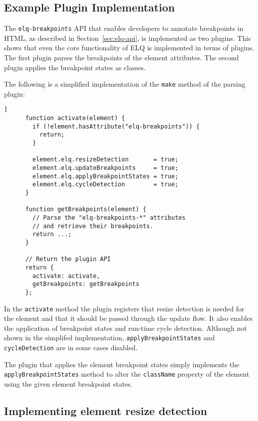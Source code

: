 \documentclass[]{llncs}
\newcommand{\code}[1]{\texttt{#1}}
\newcommand{\elq}{ELQ}
\begin{document}
  \subsection{Example Plugin Implementation}
    The \code{elq-breakpoints} API that enables developers to annotate breakpoints in HTML, as described in Section~\ref{sec:elq-api}, is implemented as two plugins.
    This shows that even the core functionality of \elq{} is implemented in terms of plugins.
    The first plugin parses the breakpoints of the element attributes.
    The second plugin applies the breakpoint states as classes.

    The following is a simplified implementation of the \code{make} method of the parsing plugin:

    \begin{lstlisting}[gobble=6,caption={},captionpos=b,label={}]]
      function activate(element) {
        if (!element.hasAttribute("elq-breakpoints")) {
          return;
        }

        element.elq.resizeDetection       = true;
        element.elq.updateBreakpoints     = true;
        element.elq.applyBreakpointStates = true;
        element.elq.cycleDetection        = true;
      }

      function getBreakpoints(element) {
        // Parse the "elq-breakpoints-*" attributes
        // and retrieve their breakpoints.
        return ...;
      }

      // Return the plugin API
      return {
        activate: activate,
        getBreakpoints: getBreakpoints
      };
    \end{lstlisting}

    \noindent
    In the \code{activate} method the plugin registers that resize detection is needed for the element and that it should be passed through the update flow.
    It also enables the application of breakpoint states and run-time cycle detection.
    Although not shown in the simplifed implementation, \code{applyBreakpointStates} and \code{cycleDetection} are in some cases disabled.

    The plugin that applies the element breakpoint states simply implements the \code{applyBreakpointStates} method to alter the \code{className} property of the element using the given element breakpoint states.

  \subsection{Implementing element resize detection}\label{sec:imp_erd}
\end{document}
